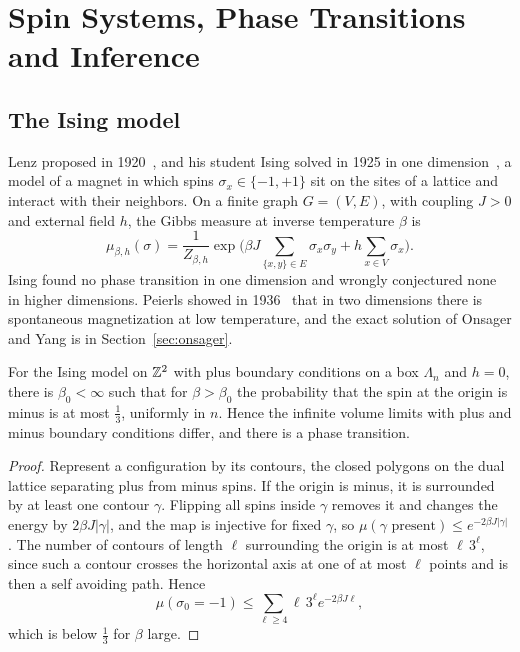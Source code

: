 \chapter{Spin Systems, Phase Transitions and Inference}
\label{ch:spins}

\section{The Ising model}

Lenz proposed in 1920~\cite{brush1967}, and his student Ising solved in 1925 in one dimension~\cite{ising1925}, a model of a magnet in which spins $\sigma_x\in\{-1,+1\}$ sit on the sites of a lattice and interact with their neighbors. On a finite graph $G = (V,E)$, with coupling $J>0$ and external field $h$, the Gibbs measure at inverse temperature $\beta$ is
\[
\mu_{\beta,h}(\sigma) = \frac{1}{Z_{\beta,h}}\exp\Big(\beta J\sum_{\{x,y\}\in E}\sigma_x\sigma_y+h\sum_{x\in V}\sigma_x\Big).
\]
Ising found no phase transition in one dimension and wrongly conjectured none in higher dimensions. Peierls showed in 1936~\cite{peierls1936} that in two dimensions there is spontaneous magnetization at low temperature, and the exact solution of Onsager and Yang is in Section~\ref{sec:onsager}.

\begin{theorem}[Peierls]
For the Ising model on $\mathbb{Z}^2$ with plus boundary conditions on a box $\Lambda_n$ and $h = 0$, there is $\beta_0<\infty$ such that for $\beta>\beta_0$ the probability that the spin at the origin is minus is at most $\frac13$, uniformly in $n$. Hence the infinite volume limits with plus and minus boundary conditions differ, and there is a phase transition.
\end{theorem}

\begin{proof}
Represent a configuration by its contours, the closed polygons on the dual lattice separating plus from minus spins. If the origin is minus, it is surrounded by at least one contour $\gamma$. Flipping all spins inside $\gamma$ removes it and changes the energy by $2\beta J|\gamma|$, and the map is injective for fixed $\gamma$, so $\mu(\gamma\text{ present})\leq e^{-2\beta J|\gamma|}$. The number of contours of length $\ell$ surrounding the origin is at most $\ell\,3^{\ell}$, since such a contour crosses the horizontal axis at one of at most $\ell$ points and is then a self avoiding path. Hence
\[
\mu(\sigma_0 = -1)\leq\sum_{\ell\geq4}\ell\,3^\ell e^{-2\beta J\ell},
\]
which is below $\frac13$ for $\beta$ large.
\end{proof}

